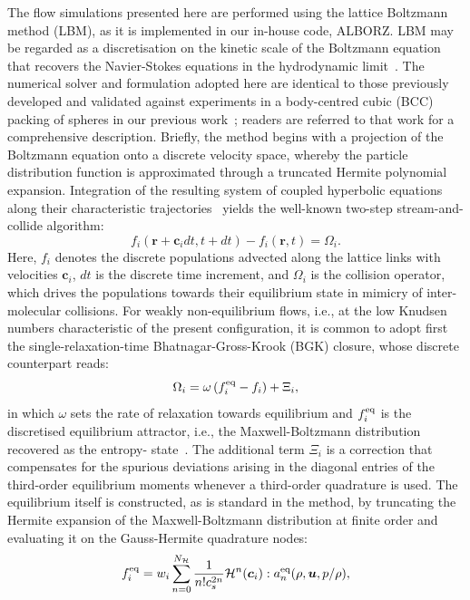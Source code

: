 The flow simulations presented here are performed using the lattice Boltzmann method (LBM), as it is implemented in our in-house code, ALBORZ. LBM may be regarded as a discretisation on the kinetic scale of the Boltzmann equation that recovers the Navier-Stokes equations in the hydrodynamic limit~\cite{Xiaoyi}. The numerical solver and formulation adopted here are identical to those previously developed and validated against experiments in a body-centred cubic (BCC) packing of spheres in our previous work~\cite{neeraj2023}; readers are referred to that work for a comprehensive description. Briefly, the method begins with a projection of the Boltzmann equation onto a discrete velocity space, whereby the particle distribution function is approximated through a truncated Hermite polynomial expansion. Integration of the resulting system of coupled hyperbolic equations along their characteristic trajectories~\cite{Bhadauria} yields the well-known two-step stream-and-collide algorithm:
\begin{equation}
    f_i\left(\bm{r}+\bm{c}_idt, t+dt\right) - f_i\left(\bm{r}, t\right) = \Omega_i.
\end{equation}
Here, $f_i$ denotes the discrete populations advected along the lattice links with velocities $\bm{c}_i$, $dt$ is the discrete time increment, and $\Omega_i$ is the collision operator, which drives the populations towards their equilibrium state in mimicry of inter-molecular collisions. For weakly non-equilibrium flows, i.e., at the low Knudsen numbers characteristic of the present configuration, it is common to adopt first the single-relaxation-time Bhatnagar-Gross-Krook (BGK) closure, whose discrete counterpart reads:
\begin{equation}
    \Omega_i = \omega\left( f^{\rm eq}_i - f_i\right) + \Xi_i,
\end{equation}
in which $\omega$ sets the rate of relaxation towards equilibrium and $f^{\rm eq}_i$ is the discretised equilibrium attractor, i.e., the Maxwell-Boltzmann distribution recovered as the entropy- state~\cite{Bhadauria,Shu}. The additional term $\Xi_i$ is a correction that compensates for the spurious deviations arising in the diagonal entries of the third-order equilibrium moments whenever a third-order quadrature is used. The equilibrium itself is constructed, as is standard in the method, by truncating the Hermite expansion of the Maxwell-Boltzmann distribution at finite order and evaluating it on the Gauss-Hermite quadrature nodes:
\begin{equation}
    f^{\rm eq}_i = w_i \sum_{n=0}^{\deleted{N}\added{N_\mathcal{H}}}\frac{1}{n!c_s^{2n}} \mathcal{H}^n(\bm{c}_i):a_n^{\rm eq}(\rho,\bm{u},p/\rho),
\end{equation}
